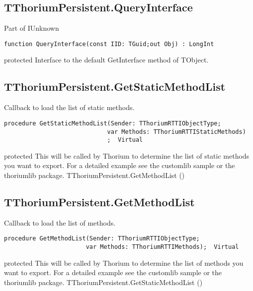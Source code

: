 \subsection{TThoriumPersistent.QueryInterface}
\label{thoriumcore:thorium:tthoriumpersistent:queryinterface}
\begin{FPCList}
\Synopsis
Part of IUnknown\Declaration 

\begin{verbatim}
function QueryInterface(const IID: TGuid;out Obj) : LongInt
\end{verbatim}
\Visibility
protected
\Description
Interface to the default GetInterface method of TObject. \Errors
\end{FPCList}
\subsection{TThoriumPersistent.GetStaticMethodList}
\label{thoriumcore:thorium:tthoriumpersistent:getstaticmethodlist}
\begin{FPCList}
\Synopsis
Callback to load the list of static methods.\Declaration 

\begin{verbatim}
procedure GetStaticMethodList(Sender: TThoriumRTTIObjectType;
                             var Methods: TThoriumRTTIStaticMethods)
                             ;  Virtual
\end{verbatim}
\Visibility
protected
\Description
This will be called by Thorium to determine the list of static methods you want to export. For a detailed example see the customlib sample or the thoriumlib package. \Errors
\SeeAlso
TThoriumPersistent.GetMethodList (\pageref{thoriumcore:thorium:tthoriumpersistent:getmethodlist})\end{FPCList}
\subsection{TThoriumPersistent.GetMethodList}
\label{thoriumcore:thorium:tthoriumpersistent:getmethodlist}
\begin{FPCList}
\Synopsis
Callback to load the list of methods.\Declaration 

\begin{verbatim}
procedure GetMethodList(Sender: TThoriumRTTIObjectType;
                       var Methods: TThoriumRTTIMethods);  Virtual
\end{verbatim}
\Visibility
protected
\Description
This will be called by Thorium to determine the list of methods you want to export. For a detailed example see the customlib sample or the thoriumlib package. \Errors
\SeeAlso
TThoriumPersistent.GetStaticMethodList (\pageref{thoriumcore:thorium:tthoriumpersistent:getstaticmethodlist})\end{FPCList}
